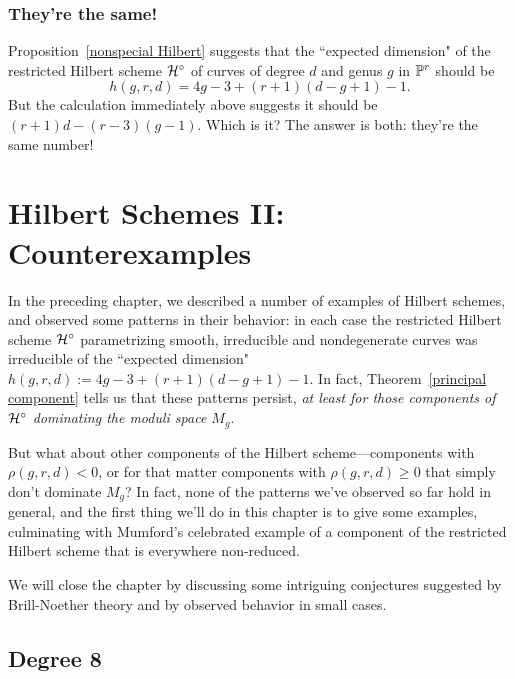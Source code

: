 \subsection{They're the same!} Proposition~\ref{nonspecial Hilbert} suggests that the ``expected dimension" of the restricted Hilbert scheme $\cH^\circ$ of curves of degree $d$ and genus $g$ in $\PP^r$ should be 
$$
h(g,r,d) = 4g-3 + (r+1)(d-g+1) - 1.
$$
But the calculation immediately above suggests it should be $(r+1)d - (r-3)(g-1)$. Which is it? The answer is both: they're the same number!

\chapter{Hilbert Schemes II: Counterexamples} 

In the preceding chapter, we described a number of examples of Hilbert schemes, and observed some patterns in their behavior: in each case the restricted Hilbert scheme $\cH^\circ$ parametrizing smooth, irreducible and nondegenerate curves was irreducible of the ``expected dimension" $h(g,r,d) :=  4g-3 + (r+1)(d-g+1) - 1$. In fact, Theorem~\ref{principal component} tells us that these patterns persist, \emph{at least for those components of $\cH^\circ$ dominating the moduli space $M_g$}.

But what about other components of the Hilbert scheme---components with $\rho(g,r,d) < 0$, or for that matter components with $\rho(g,r,d) \geq 0$ that simply don't dominate $M_g$? In fact, none of the patterns we've observed so far hold in general, and the first thing we'll do in this chapter is to give some examples, culminating with Mumford's celebrated example of a component of the restricted Hilbert scheme that is everywhere non-reduced. 


We will close the chapter by discussing some intriguing conjectures suggested by Brill-Noether theory and by observed behavior in small cases.


\section{Degree 8}\label{degree 8 section}

